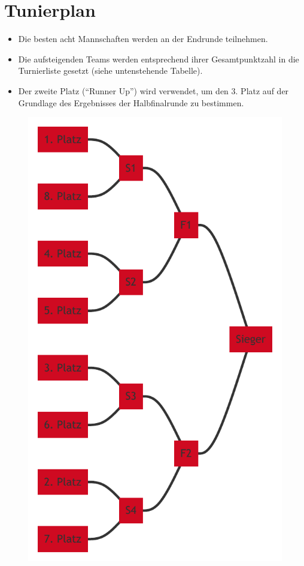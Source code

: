 \documentclass[a4paper,12pt]{article}
\begin{document}
\section{Tunierplan}
\begin{itemize}
        \item Die besten acht Mannschaften werden an der Endrunde teilnehmen.
        \item Die aufsteigenden Teams werden entsprechend ihrer Gesamtpunktzahl in die Turnierliste gesetzt (siehe untenstehende Tabelle).
        \item Der zweite Platz ("`Runner Up"') wird verwendet, um den 3. Platz auf der Grundlage des Ergebnisses der Halbfinalrunde zu bestimmen.
\end{itemize}
\begin{figure}[H]
    \centering
    \def\svgwidth{\columnwidth}
    \includegraphics{tournament_score/tournament_score.pdf}
\end{figure}
\end{document}
